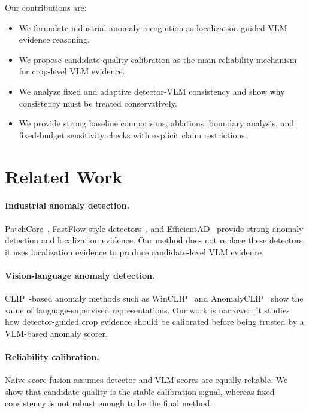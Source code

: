 \documentclass[10pt]{article}
\begin{document}
Our contributions are:
\begin{itemize}
    \item We formulate industrial anomaly recognition as localization-guided VLM evidence reasoning.
    \item We propose candidate-quality calibration as the main reliability mechanism for crop-level VLM evidence.
    \item We analyze fixed and adaptive detector-VLM consistency and show why consistency must be treated conservatively.
    \item We provide strong baseline comparisons, ablations, boundary analysis, and fixed-budget sensitivity checks with explicit claim restrictions.
\end{itemize}

\section{Related Work}

\paragraph{Industrial anomaly detection.}
PatchCore~\cite{Roth2022PatchCore}, FastFlow-style detectors~\cite{Yu2021FastFlow}, and EfficientAD~\cite{Batzner2024EfficientAD} provide strong anomaly detection and localization evidence.
Our method does not replace these detectors; it uses localization evidence to produce candidate-level VLM evidence.

\paragraph{Vision-language anomaly detection.}
CLIP~\cite{Radford2021CLIP}-based anomaly methods such as WinCLIP~\cite{Jeong2023WinCLIP} and AnomalyCLIP~\cite{Zhou2024AnomalyCLIP} show the value of language-supervised representations.
Our work is narrower: it studies how detector-guided crop evidence should be calibrated before being trusted by a VLM-based anomaly scorer.

\paragraph{Reliability calibration.}
Naive score fusion assumes detector and VLM scores are equally reliable.
We show that candidate quality is the stable calibration signal, whereas fixed consistency is not robust enough to be the final method.
\end{document}
